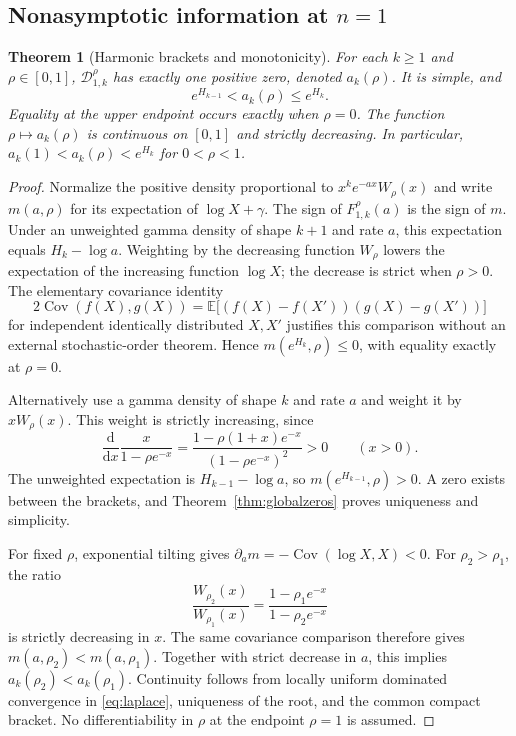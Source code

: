 \documentclass[11pt]{article}
\newtheorem{theorem}{Theorem}[section]
\theoremstyle{definition}
\theoremstyle{remark}
\newcommand{\EE}{\mathbb E}
\newcommand{\D}{\mathcal D}
\DeclareMathOperator{\Cov}{Cov}
\begin{document}
\subsection{Nonasymptotic information at \texorpdfstring{$n=1$}{n=1}}
\begin{theorem}[Harmonic brackets and monotonicity]\label{thm:n1brackets}
For each $k\geq1$ and $\rho\in[0,1]$, $\D_{1,k}^{\rho}$ has exactly one positive zero, denoted $a_k(\rho)$. It is simple, and
\begin{equation}\label{eq:brackets}
 e^{H_{k-1}}<a_k(\rho)\leq e^{H_k}.
\end{equation}
Equality at the upper endpoint occurs exactly when $\rho=0$. The function $\rho\mapsto a_k(\rho)$ is continuous on $[0,1]$ and strictly decreasing. In particular, $a_k(1)<a_k(\rho)<e^{H_k}$ for $0<\rho<1$.
\end{theorem}
\begin{proof}
Normalize the positive density proportional to $x^ke^{-ax}W_\rho(x)$ and write $m(a,\rho)$ for its expectation of $\log X+\gamma$. The sign of $F_{1,k}^{\rho}(a)$ is the sign of $m$. Under an unweighted gamma density of shape $k+1$ and rate $a$, this expectation equals $H_k-\log a$. Weighting by the decreasing function $W_\rho$ lowers the expectation of the increasing function $\log X$; the decrease is strict when $\rho>0$. The elementary covariance identity
\[
 2\Cov(f(X),g(X))
   =\EE\bigl[(f(X)-f(X'))(g(X)-g(X'))\bigr]
\]
for independent identically distributed $X,X'$ justifies this comparison without an external stochastic-order theorem. Hence $m(e^{H_k},\rho)\leq0$, with equality exactly at $\rho=0$.

Alternatively use a gamma density of shape $k$ and rate $a$ and weight it by $xW_\rho(x)$. This weight is strictly increasing, since
\[
 \frac{\mathrm d}{\mathrm dx}\frac{x}{1-\rho e^{-x}}
     =\frac{1-\rho(1+x)e^{-x}}{(1-\rho e^{-x})^2}>0\qquad(x>0).
\]
The unweighted expectation is $H_{k-1}-\log a$, so $m(e^{H_{k-1}},\rho)>0$. A zero exists between the brackets, and Theorem~\ref{thm:globalzeros} proves uniqueness and simplicity.

For fixed $\rho$, exponential tilting gives
$\partial_a m=-\Cov(\log X,X)<0$. For $\rho_2>\rho_1$, the ratio
\[
 \frac{W_{\rho_2}(x)}{W_{\rho_1}(x)}
    =\frac{1-\rho_1e^{-x}}{1-\rho_2e^{-x}}
\]
is strictly decreasing in $x$. The same covariance comparison therefore gives $m(a,\rho_2)<m(a,\rho_1)$. Together with strict decrease in $a$, this implies $a_k(\rho_2)<a_k(\rho_1)$. Continuity follows from locally uniform dominated convergence in \eqref{eq:laplace}, uniqueness of the root, and the common compact bracket. No differentiability in $\rho$ at the endpoint $\rho=1$ is assumed.
\end{proof}
\end{document}
